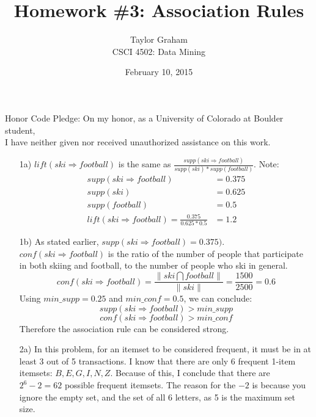 \documentclass[12pt]{article}
\begin{document}
\title{Homework \#3: Association Rules}
\author{Taylor Graham 
\\ CSCI 4502: Data Mining}
\date{February 10, 2015}

\maketitle

\begin{center}
Honor Code Pledge: On my honor, as a University of Colorado at Boulder student,\\
I have neither given nor received unauthorized assistance on this work.
\end{center}

\begin{enumerate}

\item[1a)] $lift(ski \Rightarrow football)$ is the same as $\frac{supp(ski \Rightarrow football)}{supp(ski)*supp(football)}$.  Note:
\begin{align*}	
	supp(ski \Rightarrow football) &= 0.375\\
	supp(ski) &= 0.625\\
	supp(football) &= 0.5\\
	lift(ski \Rightarrow football) = \frac{0.375}{0.625*0.5} &= 1.2
\end{align*}

\item[1b)] As stated earlier, $supp(ski \Rightarrow football) = 0.375)$.  $conf(ski \Rightarrow football)$ is the ratio of the number of people that participate in both skiing and football, to the number of people who ski in general.
	$$conf(ski \Rightarrow football) = \frac{\| ski \bigcap football \|}{\| ski \|} = \frac{1500}{2500} = 0.6$$
Using $min\_supp=0.25$ and $min\_conf=0.5$, we can conclude:
$$supp(ski \Rightarrow football)>min\_supp$$ $$conf(ski \Rightarrow football)>min\_conf$$
Therefore the association rule can be considered strong.

\item[2a)] In this problem, for an itemset to be considered frequent, it must be in at least 3 out of 5 transactions.  I know that there are only 6 frequent 1-item itemsets: ${B,E,G,I,N,Z}$.  Because of this, I conclude that there are $2^6 - 2 = 62$ possible frequent itemsets.  The reason for the $-2$ is because you ignore the empty set, and the set of all 6 letters, as 5 is the maximum set size.


\end{enumerate}
\end{document}
